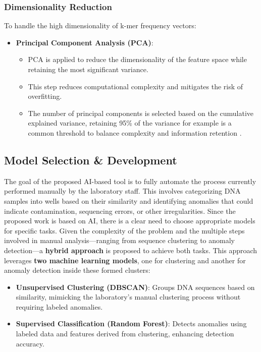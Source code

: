 \subsubsection{Dimensionality Reduction}
To handle the high dimensionality of k-mer frequency vectors:
\begin{itemize}
    \item \textbf{Principal Component Analysis (PCA)}:
    \begin{itemize}
        \item PCA is applied to reduce the dimensionality of the feature space while retaining the most significant variance.
        \item This step reduces computational complexity and mitigates the risk of overfitting.
        \item The number of principal components is selected based on the cumulative explained variance, retaining 95\% of the variance for example is a common threshold to balance complexity and information retention \cite{jolliffe2016}.
    \end{itemize}
\end{itemize}


\subsection{Model Selection \& Development}

The goal of the proposed AI-based tool is to fully automate the process currently performed manually by the laboratory staff. This involves categorizing DNA samples into wells based on their similarity and identifying anomalies that could indicate contamination, sequencing errors, or other irregularities. Since the proposed work is based on AI, there is a clear need to choose appropriate models for specific tasks. Given the complexity of the problem and the multiple steps involved in manual analysis---ranging from sequence clustering to anomaly detection---a \textbf{hybrid approach} is proposed to achieve both tasks. This approach leverages \textbf{two machine learning models}, one for clustering and another for anomaly detection inside these formed clusters:

\begin{itemize}
    \item \textbf{Unsupervised Clustering (DBSCAN)}: Groups DNA sequences based on similarity, mimicking the laboratory's manual clustering process without requiring labeled anomalies.
    \item \textbf{Supervised Classification (Random Forest)}: Detects anomalies using labeled data and features derived from clustering, enhancing detection accuracy.
\end{itemize}

